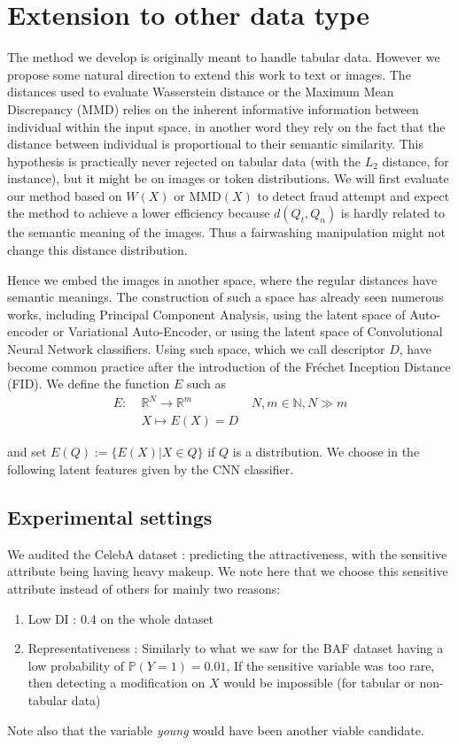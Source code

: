 \documentclass[runningheads, orivec]{llncs}
\begin{document}
\section{Extension to other data type}\label{app:sec:extension}
The method we develop is originally meant to handle tabular data. However we propose some natural direction to extend this work to text or images. The distances used to evaluate
Wasserstein distance or the Maximum Mean Discrepancy (MMD) relies on the inherent informative information between individual within the input space, in another word they rely on the fact that the distance between individual is proportional to their semantic similarity. This hypothesis is practically never rejected on tabular data (with the $L_2$ distance, for instance), but it might be on images or token distributions. 
We will first evaluate our method based on $W(X)$ or $\text{MMD}(X)$ to detect fraud attempt and expect the method to achieve a lower efficiency because $d(Q_t, Q_n)$ is hardly related to the semantic meaning of the images. Thus a fairwashing manipulation might not change this distance distribution.

Hence we embed the images in another space, where the regular distances have semantic meanings. The construction of such a space has already seen numerous works, including Principal Component Analysis, using the latent space of Auto-encoder or Variational Auto-Encoder, or using the latent space of Convolutional Neural Network classifiers. Using such space, which we call descriptor $D$, have become common practice after the introduction of the Fréchet Inception Distance (FID)\cite{heusel2018ganstrainedtimescaleupdate}. We define the function $E$ such as 
\begin{align*}
E\colon\; & \mathbb{R}^N \to \mathbb{R}^m {\hspace{2cm}N,m\in\mathbb{N}, N\gg m } \\ & X \mapsto E(X) = D
\end{align*}

and set $E(Q):=\{E(X)|X\in Q\}$ if $Q$ is a distribution.
We choose in the following latent features given by the CNN classifier.
\subsection{Experimental settings}

We audited the CelebA dataset \cite{liu2015faceattributes}: predicting the attractiveness, with the sensitive attribute being having heavy makeup. We note here that we choose this sensitive attribute instead of others for mainly two reasons: 
\begin{enumerate}
    \item Low DI : 0.4 on the whole dataset
    \item Representativeness : Similarly to what we saw for the BAF dataset having a low probability of $\mathbb{P}(Y=1)=0.01$, If the sensitive variable was too rare, then detecting a modification on $X$ would be impossible (for tabular or non-tabular data) 
\end{enumerate}
Note also that the variable \textit{young} would have been another viable candidate. 
\end{document}
